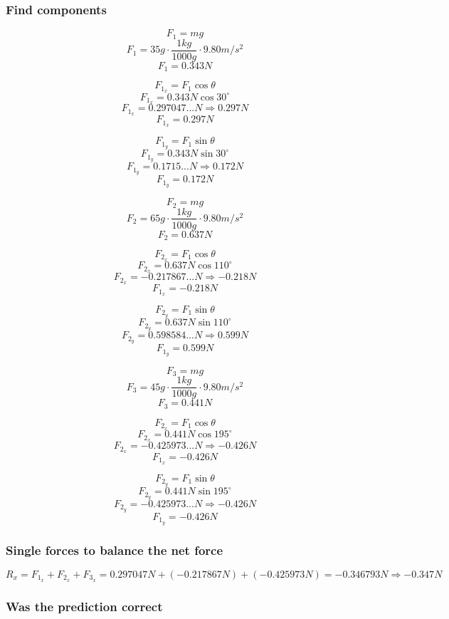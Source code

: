 \documentclass[11pt, letterpaper, includehead]{article}
\begin{document}
\subsubsection{Find components} %
\begin{multicols}{3}
  $$F_1 = mg$$
  $$F_1 = 35g \cdot \frac{1kg}{1000g} \cdot 9.80m/s^2$$
  $$F_1 = 0.343N$$

  $$F_{1_x} = F_1\cos\theta$$
  $$F_{1_x} = 0.343N\cos30^{\circ}$$
  $$F_{1_x} = 0.297047...N \Rightarrow 0.297N$$
  $$\boxed{F_{1_x} = 0.297N}$$

  $$F_{1_y} = F_1\sin\theta$$
  $$F_{1_y} = 0.343N\sin30^{\circ}$$
  $$F_{1_y} = 0.1715...N \Rightarrow 0.172N$$
  $$\boxed{F_{1_y} = 0.172N}$$

  \columnbreak
  $$F_2 = mg$$
  $$F_2 = 65g \cdot \frac{1kg}{1000g} \cdot 9.80m/s^2$$
  $$F_2 = 0.637N$$

  $$F_{2_x} = F_1\cos\theta$$
  $$F_{2_x} = 0.637N\cos110^{\circ}$$
  $$F_{2_x} = -0.217867...N \Rightarrow -0.218N$$
  $$\boxed{F_{1_x} = -0.218N}$$

  $$F_{2_y} = F_1\sin\theta$$
  $$F_{2_y} = 0.637N\sin110^{\circ}$$
  $$F_{2_y} = 0.598584...N \Rightarrow 0.599N$$
  $$\boxed{F_{1_y} = 0.599N}$$

  \columnbreak
  $$F_3 = mg$$
  $$F_3 = 45g \cdot \frac{1kg}{1000g} \cdot 9.80m/s^2$$
  $$F_3 = 0.441N$$

  $$F_{2_x} = F_1\cos\theta$$
  $$F_{2_x} = 0.441N\cos195^{\circ}$$
  $$F_{2_x} = -0.425973...N \Rightarrow -0.426N$$
  $$\boxed{F_{1_x} = -0.426N}$$

  $$F_{2_y} = F_1\sin\theta$$
  $$F_{2_y} = 0.441N\sin195^{\circ}$$
  $$F_{2_y} = -0.425973...N \Rightarrow -0.426N$$
  $$\boxed{F_{1_y} = -0.426N}$$
 
\end{multicols}

\subsubsection{Single forces to balance the net force} %
$$R_x = F_{1_x} + F_{2_x} + F_{3_x} = 0.297047N + (-0.217867N) + (-0.425973N) = -0.346793N \Rightarrow \boxed{-0.347N} $$

\subsubsection{Was the prediction correct} %

\end{document}
